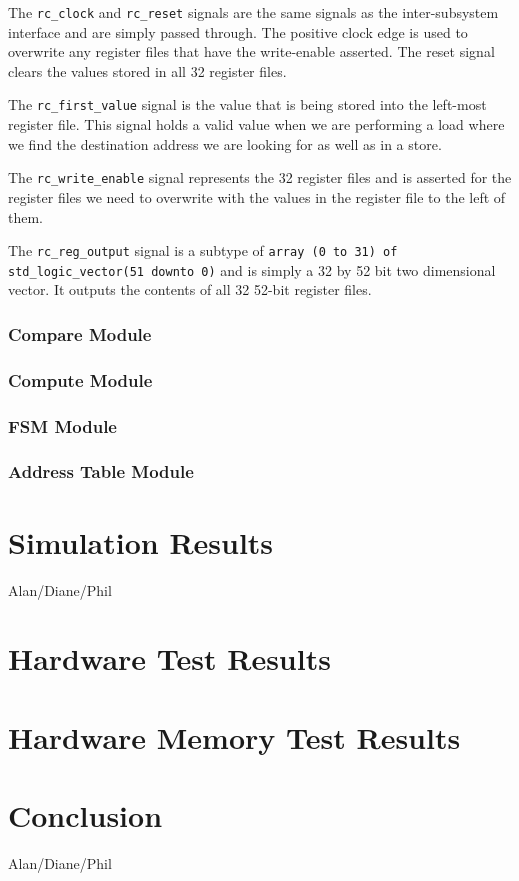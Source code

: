 \documentclass{article}
\begin{document}
The \texttt{rc\_clock} and \texttt{rc\_reset} signals are the same signals as the inter-subsystem interface and are simply passed through. The positive clock edge is used to overwrite any register files that have the write-enable asserted. The reset signal clears the values stored in all 32 register files.

The \texttt{rc\_first\_value} signal is the value that is being stored into the left-most register file. This signal holds a valid value when we are performing a load where we find the destination address we are looking for as well as in a store. 

The \texttt{rc\_write\_enable} signal represents the 32 register files and is asserted for the register files we need to overwrite with the values in the register file to the left of them. 

The \texttt{rc\_reg\_output} signal is a subtype of \texttt{array (0 to 31) of std\_logic\_vector(51 downto 0)} and is simply a 32 by 52 bit two dimensional vector. It outputs the contents of all 32 52-bit register files.

\subsubsection{Compare Module}

\subsubsection{Compute Module}

\subsubsection{FSM Module}

\subsubsection{Address Table Module}

\section{Simulation Results}

Alan/Diane/Phil

\section{Hardware Test Results}

\section{Hardware Memory Test Results}

\section{Conclusion}

Alan/Diane/Phil
\end{document}
